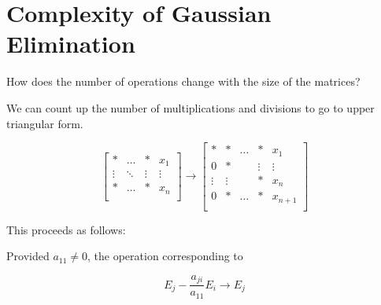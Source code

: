 \section{Complexity of Gaussian Elimination}

How does the number of operations change with the size of the matrices?

We can count up the number of multiplications and divisions to go to upper
triangular form.

\begin{equation*}
  \begin{bmatrix}
  * & \dots & * & x_1\\
  \vdots & \ddots & \vdots & \vdots\\
  * & \dots & * & x_n\\
  \end{bmatrix} 
  \to
  \begin{bmatrix}
   * & * & \dots & * & x_1\\
   0 & * &  & \vdots &  \vdots \\
   \vdots & \vdots & & * & x_n \\
   0 & * & \dots & * & x_{n+1} \\
  \end{bmatrix}
\end{equation*}

This proceeds as follows:

Provided $a_{11} \ne 0$, the operation corresponding to 

\begin{equation*}
  E_j - \frac{a_{ji}}{a_{11}} E_i \to E_j
\end{equation*}

